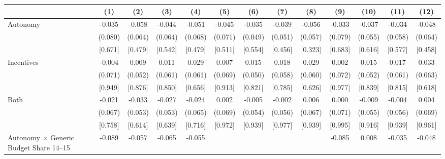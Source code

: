 \begin{tabular}{l*{12}{c}}
\toprule
                     &\multicolumn{1}{c}{(1)}&\multicolumn{1}{c}{(2)}&\multicolumn{1}{c}{(3)}&\multicolumn{1}{c}{(4)}&\multicolumn{1}{c}{(5)}&\multicolumn{1}{c}{(6)}&\multicolumn{1}{c}{(7)}&\multicolumn{1}{c}{(8)}&\multicolumn{1}{c}{(9)}&\multicolumn{1}{c}{(10)}&\multicolumn{1}{c}{(11)}&\multicolumn{1}{c}{(12)}\\
\midrule
Autonomy             &      -0.035&      -0.058&      -0.044&      -0.051&      -0.045&      -0.035&      -0.039&      -0.056&      -0.033&      -0.037&      -0.034&      -0.048\\
                     &     (0.080)&     (0.064)&     (0.064)&     (0.068)&     (0.071)&     (0.049)&     (0.051)&     (0.057)&     (0.079)&     (0.055)&     (0.058)&     (0.064)\\
                     &     [0.671]&     [0.479]&     [0.542]&     [0.479]&     [0.511]&     [0.554]&     [0.456]&     [0.323]&     [0.683]&     [0.616]&     [0.577]&     [0.458]\\\addlinespace
Incentives           &      -0.004&       0.009&       0.011&       0.029&       0.007&       0.015&       0.018&       0.029&       0.002&       0.015&       0.017&       0.033\\
                     &     (0.071)&     (0.052)&     (0.061)&     (0.061)&     (0.069)&     (0.050)&     (0.058)&     (0.060)&     (0.072)&     (0.052)&     (0.061)&     (0.063)\\
                     &     [0.949]&     [0.876]&     [0.850]&     [0.656]&     [0.913]&     [0.821]&     [0.785]&     [0.626]&     [0.977]&     [0.839]&     [0.815]&     [0.618]\\\addlinespace
Both                 &      -0.021&      -0.033&      -0.027&      -0.024&       0.002&      -0.005&      -0.002&       0.006&       0.000&      -0.009&      -0.004&       0.004\\
                     &     (0.067)&     (0.053)&     (0.053)&     (0.065)&     (0.069)&     (0.054)&     (0.056)&     (0.067)&     (0.071)&     (0.055)&     (0.056)&     (0.069)\\
                     &     [0.758]&     [0.614]&     [0.639]&     [0.716]&     [0.972]&     [0.939]&     [0.977]&     [0.939]&     [0.995]&     [0.916]&     [0.939]&     [0.961]\\\addlinespace
Autonomy $\times$ Generic Budget Share 14--15&      -0.089&      -0.057&      -0.065&      -0.055&            &            &            &            &      -0.085&       0.008&      -0.035&      -0.048\\

\end{tabular}
